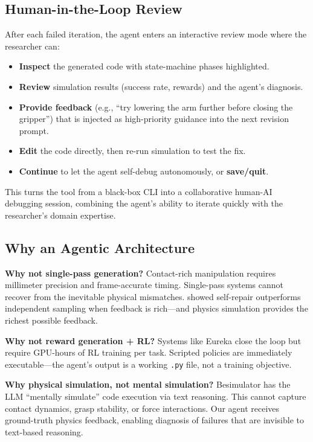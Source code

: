 \documentclass[11pt]{article}
\begin{document}
\subsection{Human-in-the-Loop Review}

After each failed iteration, the agent enters an interactive review mode where the researcher can:
\begin{itemize}[nosep]
    \item \textbf{Inspect} the generated code with state-machine phases highlighted.
    \item \textbf{Review} simulation results (success rate, rewards) and the agent's diagnosis.
    \item \textbf{Provide feedback} (e.g., ``try lowering the arm further before closing the gripper'') that is injected as high-priority guidance into the next revision prompt.
    \item \textbf{Edit} the code directly, then re-run simulation to test the fix.
    \item \textbf{Continue} to let the agent self-debug autonomously, or \textbf{save/quit}.
\end{itemize}
This turns the tool from a black-box CLI into a collaborative human-AI debugging session, combining the agent's ability to iterate quickly with the researcher's domain expertise.

\subsection{Why an Agentic Architecture}

\textbf{Why not single-pass generation?}
Contact-rich manipulation requires millimeter precision and frame-accurate timing. Single-pass systems \citep{liang2023code} cannot recover from the inevitable physical mismatches. \citet{olausson2024selfrepair} showed self-repair outperforms independent sampling when feedback is rich---and physics simulation provides the richest possible feedback.

\textbf{Why not reward generation + RL?}
Systems like Eureka \citep{ma2024eureka} close the loop but require GPU-hours of RL training per task. Scripted policies are immediately executable---the agent's output is a working \texttt{.py} file, not a training objective.

\textbf{Why physical simulation, not mental simulation?}
Besimulator \citep{besimulator2024} has the LLM ``mentally simulate'' code execution via text reasoning. This cannot capture contact dynamics, grasp stability, or force interactions. Our agent receives ground-truth physics feedback, enabling diagnosis of failures that are invisible to text-based reasoning.
\end{document}
